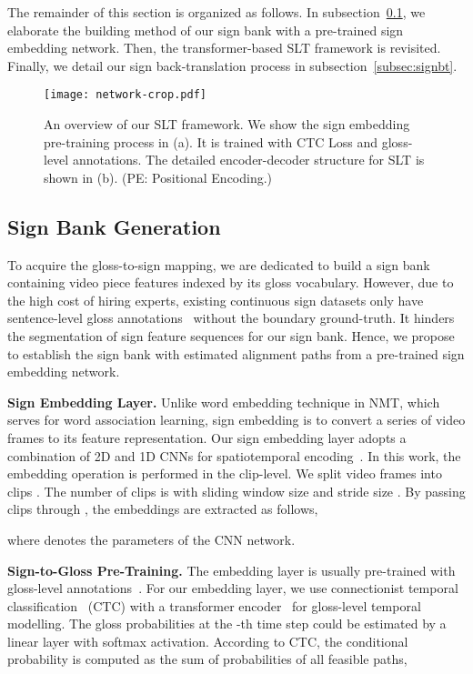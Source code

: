 \documentclass[final]{cvpr}
\begin{document}
The remainder of this section is organized as follows. 
In subsection~\ref{subsec:signbank}, we elaborate the building method of our sign bank with a pre-trained sign embedding network. 
Then, the transformer-based SLT framework is revisited. Finally, we detail our sign back-translation process in subsection~\ref{subsec:signbt}. 

\begin{figure}[tp]
   \centering
   \texttt{[image: network-crop.pdf]}
   \caption{An overview of our SLT framework. We show the sign embedding pre-training process in (a). 
   It is trained with CTC Loss and gloss-level annotations. 
   The detailed encoder-decoder structure for SLT is shown in (b). (PE: Positional Encoding.)
   }\label{fig:framework}
\vspace{-8pt}
\end{figure}

\subsection{Sign Bank Generation} \label{subsec:signbank}

To acquire the gloss-to-sign mapping, we are dedicated to build a sign bank containing video piece features indexed by its gloss vocabulary. 
However, due to the high cost of hiring experts, existing continuous sign datasets only have sentence-level gloss annotations~\cite{slt-nslt-cihan18,phoenix2014,csl-icme16} without the boundary ground-truth. 
It hinders the segmentation of sign feature sequences for our sign bank. 
Hence, we propose to establish the sign bank with estimated alignment paths from a pre-trained sign embedding network. 

\textbf{Sign Embedding Layer.} 
Unlike word embedding technique in NMT, which serves for word association learning, 
sign embedding is to convert a series of video frames to its feature representation. 
Our sign embedding layer  adopts a combination of 2D and 1D CNNs for spatiotemporal encoding~\cite{cui-tmm19}. 
In this work, the embedding operation is performed in the clip-level. 
We split video frames  into  clips . 
The number of clips is  with sliding window size  and stride size . 
By passing clips through , the embeddings  are extracted as follows, 

where  denotes the parameters of the CNN network. 

\textbf{Sign-to-Gloss Pre-Training.}
The embedding layer is usually pre-trained with gloss-level annotations~\cite{slt-nslt-cihan18,slt-trans-cihan20}. 
For our embedding layer, we use connectionist temporal classification~\cite{CTCLoss} (CTC) with a transformer encoder~\cite{trans-vaswani17attention} for gloss-level temporal modelling.
The gloss probabilities  at the -th time step could be estimated by a linear layer with softmax activation. 
According to CTC, the conditional probability  is computed as the sum of probabilities of all feasible paths, 
\end{document}
